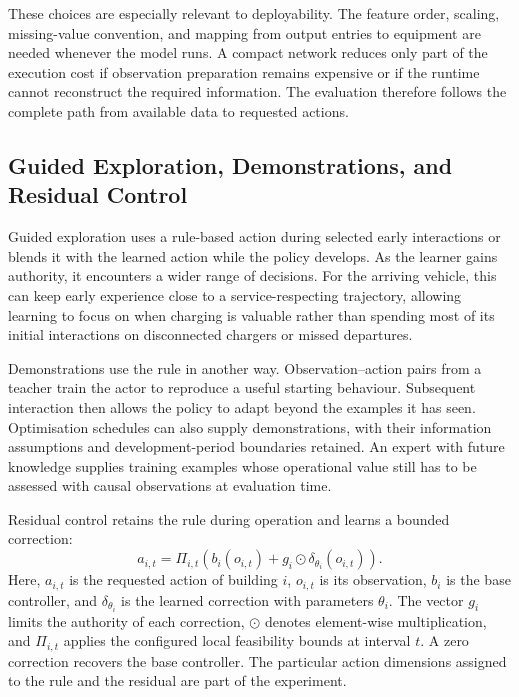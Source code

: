These choices are especially relevant to deployability. The feature order, scaling, missing-value convention, and mapping from output entries to equipment are needed whenever the model runs. A compact network reduces only part of the execution cost if observation preparation remains expensive or if the runtime cannot reconstruct the required information. The evaluation therefore follows the complete path from available data to requested actions.

\subsection{Guided Exploration, Demonstrations, and Residual Control}

Guided exploration uses a rule-based action during selected early interactions or blends it with the learned action while the policy develops. As the learner gains authority, it encounters a wider range of decisions. For the arriving vehicle, this can keep early experience close to a service-respecting trajectory, allowing learning to focus on when charging is valuable rather than spending most of its initial interactions on disconnected chargers or missed departures.

Demonstrations use the rule in another way. Observation--action pairs from a teacher train the actor to reproduce a useful starting behaviour. Subsequent interaction then allows the policy to adapt beyond the examples it has seen. Optimisation schedules can also supply demonstrations, with their information assumptions and development-period boundaries retained. An expert with future knowledge supplies training examples whose operational value still has to be assessed with causal observations at evaluation time.

\begin{samepage}
Residual control retains the rule during operation and learns a bounded correction:
\begin{equation}
 a_{i,t}=\Pi_{i,t}\!\left(b_i(o_{i,t})+g_i\odot\delta_{\theta_i}(o_{i,t})\right).
 \label{eq:control-residual-policy}
\end{equation}
Here, $a_{i,t}$ is the requested action of building $i$, $o_{i,t}$ is its observation, $b_i$ is the base controller, and $\delta_{\theta_i}$ is the learned correction with parameters $\theta_i$. The vector $g_i$ limits the authority of each correction, $\odot$ denotes element-wise multiplication, and $\Pi_{i,t}$ applies the configured local feasibility bounds at interval $t$. A zero correction recovers the base controller. The particular action dimensions assigned to the rule and the residual are part of the experiment.
\end{samepage}

